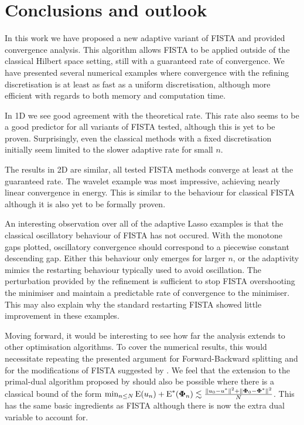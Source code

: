 \documentclass[10pt,a4paper,onecolumn]{article}
\numberwithin{equation}{section}
\newcommand{\norm}[1]{{\left\lVert #1 \right\rVert}}
\newcommand{\op}[1]{\operatorname{#1}}\newcommand{\overtext}[2]{\stackrel{\text{#1}}{#2}}
\renewcommand{\vec}{\mathbf}
\newcommand*{\Func}[1]{%
	\IfEqCase{#1}{%
		{0}{\op{E}}%
		{1}{\op{F}}%
		{2}{\op{G}}%
		{3}{\op{H}}%
	}[\op{F}#1]%
}
\newcommand*{\varf}[1]{%
	\IfEqCase{#1}{%
		{0}{u}%
		{1}{v}%
		{2}{w}%
	}[u#1]%
}
\newcommand*{\vard}[1]{%
	\IfEqCase{#1}{%
		{0}{\varphi}%
		{1}{\psi}%
	}[\varphi #1]%
}
\newcommand*{\data}[1]{%
	\IfEqCase{#1}{%
		{0}{\eta}%
		{1}{\nu}%
	}[g]%
}
\newcommand*{\vvard}[1]{\vec{\vard{#1}}}\newcommand*{\vdata}[1]{\vec{\data{#1}}}
\begin{document}
\section{Conclusions and outlook}
In this work we have proposed a new adaptive variant of FISTA and provided convergence analysis. This algorithm allows FISTA to be applied outside of the classical Hilbert space setting, still with a guaranteed rate of convergence. We have presented several numerical examples where convergence with the refining discretisation is at least as fast as a uniform discretisation, although more efficient with regards to both memory and computation time. 

In 1D we see good agreement with the theoretical rate. This rate also seems to be a good predictor for all variants of FISTA tested, although this is yet to be proven. Surprisingly, even the classical methods with a fixed discretisation initially seem limited to the slower adaptive rate for small $n$.

The results in 2D are similar, all tested FISTA methods converge at least at the guaranteed rate. The wavelet example was most impressive, achieving nearly linear convergence in energy. This is similar to the behaviour for classical FISTA although it is also yet to be formally proven.

An interesting observation over all of the adaptive Lasso examples is that the classical oscillatory behaviour of FISTA has not occured. With the monotone gaps plotted, oscillatory convergence should correspond to a piecewise constant descending gap. Either this behaviour only emerges for larger $n$, or the adaptivity mimics the restarting behaviour typically used to avoid oscillation. The perturbation provided by the refinement is sufficient to stop FISTA overshooting the minimiser and maintain a predictable rate of convergence to the minimiser. This may also explain why the standard restarting FISTA showed little improvement in these examples.

Moving forward, it would be interesting to see how far the analysis extends to other optimisation algorithms. To cover the numerical results, this would necessitate repeating the presented argument for Forward-Backward splitting and for the modifications of FISTA suggested by \cite{Liang2018}. We feel that the extension to the primal-dual algorithm proposed by \cite{Chambolle2011} should also be possible where there is a classical bound of the form $\min_{n\leq N}\Func0(\varf0_n)+\Func0^*(\vvard0_n) \lesssim \frac{\norm{\varf0_0-\varf0^*}^2 + \norm{\vvard0_0-\vvard0^*}^2}{N}$. This has the same basic ingredients as FISTA although there is now the extra dual variable to account for.
\end{document}
